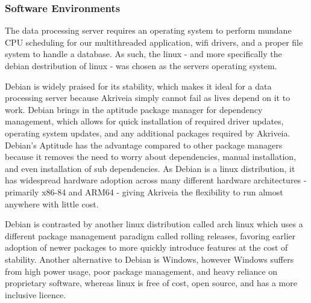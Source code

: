 \bigskip
\subsubsection{Software Environments}
The data processing server requires an operating system to perform mundane CPU scheduling for our multithreaded application, wifi drivers, and a proper file system to handle a database.
As such, the linux - and more specifically the debian destribution of linux - was chosen as the servers operating system.

\bigskip
Debian is widely praised for its stability, which makes it ideal for a data processing server because Akriveia simply cannot fail as lives depend on it to work.
Debian brings in the aptitude package manager for dependency management, which allows for quick installation of required driver updates, operating system updates, and any additional packages required by Akriveia.
Debian's Aptitude has the advantage compared to other package managers because it removes the need to worry about dependencies, manual installation, and even installation of sub dependencies.
As Debian is a linux distribution, it has widespread hardware adoption across many different hardware architectures - primarily x86-84 and ARM64 - giving Akriveia the flexibility to run almost anywhere with little cost.

\bigskip
Debian is contrasted by another linux distribution called arch linux which uses a different package management paradigm called rolling releases, favoring earlier adoption of newer packages to more quickly introduce features at the cost of stability.
Another alternative to Debian is Windows, however Windows suffers from high power usage, poor package management, and heavy reliance on proprietary software, whereas linux is free of cost, open source, and has a more inclusive licence.

\bigskip
